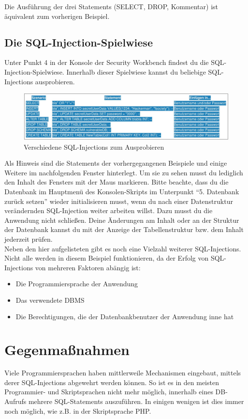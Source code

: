 Die Ausführung der drei Statements (SELECT, DROP, Kommentar) ist äquivalent zum vorherigen Beispiel.

\subsection{Die SQL-Injection-Spielwiese}
Unter Punkt 4 in der Konsole der Security Workbench findest du die SQL-Injection-Spielwiese. Innerhalb dieser Spielwiese kannst du beliebige SQL-Injections ausprobieren.

\begin{figure}[H]
	\centering
	\includegraphics[width=\textwidth]{images/SQL_Injection/various_injections.jpg}
	\caption{Verschiedene SQL-Injections zum Ausprobieren}
	\label{fig:various_injections}
\end{figure}

Als Hinweis sind die Statements der vorhergegangenen Beispiele und einige Weitere im nachfolgenden Fenster hinterlegt. Um sie zu sehen musst du lediglich den Inhalt des Fensters mit der Maus markieren. Bitte beachte, dass du die Datenbank im Hauptmenü des Konsolen-Skripts im Unterpunkt \enquote{5. Datenbank zurück setzen} wieder initialisieren musst, wenn du nach einer Datenstruktur verändernden SQL-Injection weiter arbeiten willst. Dazu musst du die Anwendung nicht schließen. Deine Änderungen am Inhalt oder an der Struktur der Datenbank kannst du mit der Anzeige der Tabellenstruktur bzw. dem Inhalt jederzeit prüfen.\\

Neben den hier aufgelisteten gibt es noch eine Vielzahl weiterer SQL-Injections. Nicht alle werden in diesem Beispiel funktionieren, da der Erfolg von SQL-Injections von mehreren Faktoren abängig ist:
\begin{itemize}
	\item Die Programmiersprache der Anwendung
	\item Das verwendete DBMS
	\item Die Berechtigungen, die der Datenbankbenutzer der Anwendung inne hat
\end{itemize}

\section{Gegenmaßnahmen}
Viele Programmiersprachen haben mittlerweile Mechanismen eingebaut, mittels derer SQL-Injections abgewehrt werden können. So ist es in den meisten Programmier- und Skriptsprachen nicht mehr möglich, innerhalb eines DB-Aufrufs mehrere SQL-Statements auszuführen. In einigen wenigen ist dies immer noch möglich, wie z.B. in der Skriptsprache PHP.
